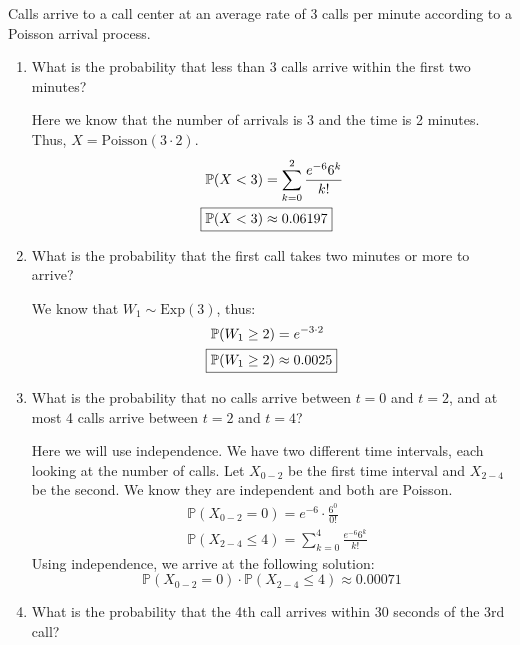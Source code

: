 \documentclass[titlepage, 12pt, leqno]{article}
\begin{document}
\begin{ex}
    Calls arrive to a call center at an average rate of 3 calls per minute
    according to a Poisson arrival process.
    \begin{enumerate}
        \item What is the probability that less than 3 calls arrive within the
            first two minutes?
            \vspace{10px}
            
            Here we know that the number of arrivals is 3 and the time is 2
            minutes. Thus, $X = \text{Poisson}(3 \cdot 2)$.
           \begin{align*}
               \mathbb{P}(X < 3) &= \sum_{k=0}^{2}\frac{e^{-6}6^k}{k!}\\
               \Aboxed{\mathbb{P}(X<3) &\approx 0.06197} 
           \end{align*}
        \item What is the probability that the first call takes two minutes or 
            more to arrive?
            \vspace{10px}
            
            We know that $W_1 \sim \text{Exp}(3)$, thus:
           \begin{align*}
               \mathbb{P}(W_1 \ge 2) &= e^{-3 \cdot2} \\
               \Aboxed{\mathbb{P}(W_1 \ge 2) &\approx 0.0025} 
           \end{align*}
           
        \item What is the probability that no calls arrive between $t=0$ and 
            $t=2$, and at most 4 calls arrive between $t=2$ and $t=4$?
            \vspace{10px}
            
            Here we will use independence. We have two different time intervals, 
            each looking at the number of calls. Let $X_{0-2}$ be the first time
            interval and $X_{2-4}$ be the second. We know they are independent
            and both are Poisson.
           \begin{align*}
               &\mathbb{P}(X_{0-2}=0) = e^{-6} \cdot \frac{6^0}{0!}\\
               &\mathbb{P}(X_{2-4} \le 4) = \sum_{k=0}^{4}
               \frac{e^{-6}6^k}{k!}
           \end{align*}
            Using independence, we arrive at the following solution:
            \[
                \mathbb{P}(X_{0-2}=0) \cdot \mathbb{P}(X_{2-4}\le4)
                \boxed{\approx 0.00071} 
            \]
        \item What is the probability that the 4th call arrives within 30 
            seconds of the 3rd call?
            \vspace{10px}


\end{enumerate}
\end{ex}
\end{document}
